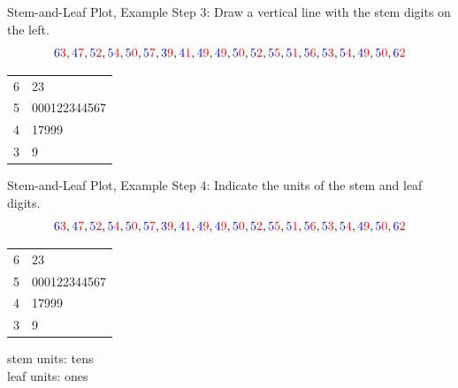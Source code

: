 \documentclass{beamer}
\newcommand{\blue}[1]{{\color{blue} #1}}
\newcommand{\red}[1]{{\color{red} #1}}
\newcommand{\bluRed}[2]{{\color{blue} #1}{\color{red} #2}}
\begin{document}
\begin{frame}{Stem-and-Leaf Plot, Example}
    Step 3: Draw a vertical line with the \blue{stem} digits on the left.
    \[\bluRed{6}{3},
        \bluRed{4}{7},
        \bluRed{5}{2},
        \bluRed{5}{4},
        \bluRed{5}{0},
        \bluRed{5}{7},
        \bluRed{3}{9},
        \bluRed{4}{1},
        \bluRed{4}{9},
        \bluRed{4}{9},
        \bluRed{5}{0},
        \bluRed{5}{2},
        \bluRed{5}{5},
        \bluRed{5}{1},
        \bluRed{5}{6},
        \bluRed{5}{3},
        \bluRed{5}{4},
        \bluRed{4}{9},
        \bluRed{5}{0},
        \bluRed{6}{2}\]
    \begin{table}
        \begin{tabular}{r | l}
            \blue{6} & \red{23}           \\
            \blue{5} & \red{000122344567} \\
            \blue{4} & \red{17999}        \\
            \blue{3} & \red{9}            \\
        \end{tabular}
    \end{table}
\end{frame}

\begin{frame}{Stem-and-Leaf Plot, Example}
    Step 4: Indicate the units of the \red{stem} and \blue{leaf} digits.
    \[\bluRed{6}{3},
        \bluRed{4}{7},
        \bluRed{5}{2},
        \bluRed{5}{4},
        \bluRed{5}{0},
        \bluRed{5}{7},
        \bluRed{3}{9},
        \bluRed{4}{1},
        \bluRed{4}{9},
        \bluRed{4}{9},
        \bluRed{5}{0},
        \bluRed{5}{2},
        \bluRed{5}{5},
        \bluRed{5}{1},
        \bluRed{5}{6},
        \bluRed{5}{3},
        \bluRed{5}{4},
        \bluRed{4}{9},
        \bluRed{5}{0},
        \bluRed{6}{2}\]
    \begin{table}
        \begin{tabular}{r | l}
            \blue{6} & \red{23}           \\
            \blue{5} & \red{000122344567} \\
            \blue{4} & \red{17999}        \\
            \blue{3} & \red{9}            \\
        \end{tabular}
    \end{table}
    \blue{stem units: tens}\\
    \red{leaf units: ones}
\end{frame}
\end{document}
